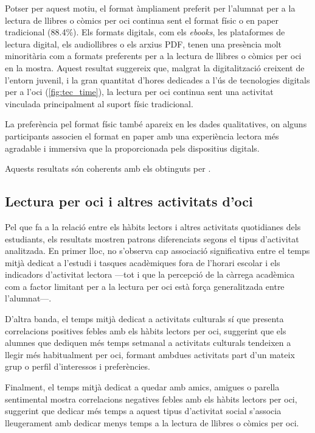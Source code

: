 \documentclass[12pt]{article}
\begin{document}
Potser per aquest motiu, el format àmpliament preferit per l’alumnat per a la lectura de llibres o còmics per oci continua sent el format físic o en paper tradicional (88.4\%). Els formats digitals, com els \emph{ebooks}, les plataformes de lectura digital, els audiollibres o els arxius PDF, tenen una presència molt minoritària com a formats preferents per a la lectura de llibres o còmics per oci en la mostra. Aquest resultat suggereix que, malgrat la digitalització creixent de l’entorn juvenil, i la gran quantitat d'hores dedicades a l'ús de tecnologies digitals per a l'oci (\autoref{fig:tec_time}), la lectura per oci continua sent una activitat vinculada principalment al suport físic tradicional.

La preferència pel format físic també apareix en les dades qualitatives, on alguns participants associen el format en paper amb una experiència lectora més agradable i immersiva que la proporcionada pels dispositius digitals.

Aquests resultats són coherents amb els obtinguts per \textcite{shutaleva}.

\subsection{Lectura per oci i altres activitats d'oci}
Pel que fa a la relació entre els hàbits lectors i altres activitats quotidianes dels estudiants, els resultats mostren patrons diferenciats segons el tipus d’activitat analitzada. En primer lloc, no s’observa cap associació significativa entre el temps mitjà dedicat a l’estudi i tasques acadèmiques fora de l'horari escolar i els indicadors d’activitat lectora ---tot i que la percepció de la càrrega acadèmica com a factor limitant per a la lectura per oci està força generalitzada entre l’alumnat---.

D'altra banda, el temps mitjà dedicat a activitats culturals sí que presenta correlacions positives febles amb els hàbits lectors per oci, suggerint que els alumnes que dediquen més temps setmanal a activitats culturals tendeixen a llegir més habitualment per oci, formant ambdues activitats part d’un mateix grup o perfil d'interessos i preferències.

Finalment, el temps mitjà dedicat a quedar amb amics, amigues o parella sentimental mostra correlacions negatives febles amb els hàbits lectors per oci, suggerint que dedicar més temps a aquest tipus d’activitat social s’associa lleugerament amb dedicar menys temps a la lectura de llibres o còmics per oci.
\end{document}
